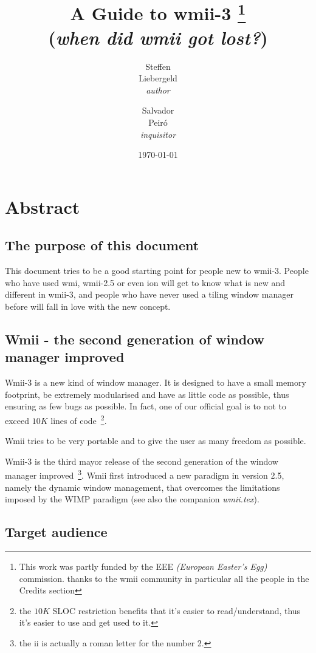 \documentclass[12pt,a4paper]{article} %
\date{\today}
\author{ 
Steffen \\ Liebergeld \\ \emph{author}
\and
Salvador \\ Peir\'o \\ \emph{inquisitor}
}
\title{A Guide to wmii-3%
\thanks{This work was partly funded by the EEE \emph{(European Easter's Egg)}
commission. thanks to the wmii community in particular all the people in the Credits section} \\
\small{(\emph{when did wmii got lost?})}
}
\begin{document}
\maketitle

\tableofcontents

\newpage

\section{Abstract}

  \subsection{The purpose of this document}

    This document tries to be a good starting point for people new to
    wmii-3.  People who have used wmi, wmii-2.5 or even ion will get
    to know what is new and different in wmii-3, and people who have
    never used a tiling window manager before will fall in love with
    the new concept.
  
  \subsection{Wmii - the second generation of window manager improved}

    Wmii-3 is a new kind of window manager. It is designed to have a
    small memory footprint, be extremely modularised and have as
    little code as possible, thus ensuring as few bugs as possible. In
    fact, one of our official goal is to not to exceed $10 K$ lines of
    code~\footnote{
    the $10 K$ SLOC restriction benefits that it's easier
    to read/understand, thus it's easier to use and get used to it.}.

    Wmii tries to be very portable and to give the user as many
    freedom as possible.

    Wmii-3 is the third mayor release of the second generation of the
    window manager improved~\footnote{ the ii is actually a roman
    letter for the number 2.}.  Wmii first introduced a new paradigm
    in version 2.5, namely the dynamic window management, that
    overcomes the limitations imposed by the WIMP paradigm (see also
    the companion \emph{wmii.tex}).
  
  \subsection{Target audience}
\end{document}
